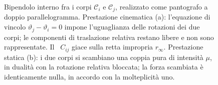 \begin{figure}[htbp]
	\caption[Bipendolo interno fra due corpi: prestazioni cinematica e statica.]{%
		Bipendolo interno fra i corpi $\mathcal{C}_i$ e
		$\mathcal{C}_j$, realizzato come pantografo a doppio
		parallelogramma. Prestazione cinematica (a): l'equazione
		di vincolo $\vartheta_j - \vartheta_i = 0$ impone l'uguaglianza
		delle rotazioni dei due corpi; le componenti di traslazione
		relativa restano libere e non sono rappresentate. Il \CRr\
		$C_{ij}$ giace sulla retta impropria $r_\infty$.
		Prestazione statica (b): i due corpi si scambiano
		una coppia pura di intensità $\mu$, in dualità con la
		rotazione relativa bloccata; la forza scambiata è
		identicamente nulla, in accordo con la molteplicità uno.}
	\label{fig:bipendolo_interno}
\end{figure}

